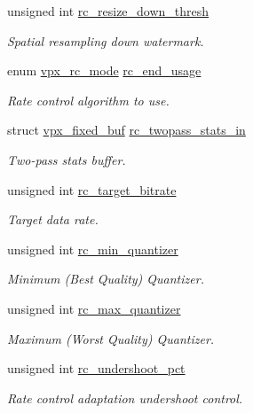 \begin{DoxyCompactItemize}
unsigned int \hyperlink{structvpx__codec__enc__cfg_a1be7bd7b0eaf1e99b5e4028c37c65488}{rc\-\_\-resize\-\_\-down\-\_\-thresh}
\begin{DoxyCompactList}\small\item\em Spatial resampling down watermark. \end{DoxyCompactList}\item 
enum \hyperlink{group__encoder_gaf50e74d91be4cae6f70dfeba5b7410d2}{vpx\-\_\-rc\-\_\-mode} \hyperlink{structvpx__codec__enc__cfg_a99c415edb6c6f909a095a57c3430a116}{rc\-\_\-end\-\_\-usage}
\begin{DoxyCompactList}\small\item\em Rate control algorithm to use. \end{DoxyCompactList}\item 
struct \hyperlink{structvpx__fixed__buf}{vpx\-\_\-fixed\-\_\-buf} \hyperlink{structvpx__codec__enc__cfg_a618616a07d9d8883c544731957b56f3c}{rc\-\_\-twopass\-\_\-stats\-\_\-in}
\begin{DoxyCompactList}\small\item\em Two-\/pass stats buffer. \end{DoxyCompactList}\item 
unsigned int \hyperlink{structvpx__codec__enc__cfg_ab8339685175d66710f482706cc9f0aed}{rc\-\_\-target\-\_\-bitrate}
\begin{DoxyCompactList}\small\item\em Target data rate. \end{DoxyCompactList}\item 
unsigned int \hyperlink{structvpx__codec__enc__cfg_a1324600e3c63faaa7717e85cf6509dd9}{rc\-\_\-min\-\_\-quantizer}
\begin{DoxyCompactList}\small\item\em Minimum (Best Quality) Quantizer. \end{DoxyCompactList}\item 
unsigned int \hyperlink{structvpx__codec__enc__cfg_a8abdd985d317b720e142335887d737df}{rc\-\_\-max\-\_\-quantizer}
\begin{DoxyCompactList}\small\item\em Maximum (Worst Quality) Quantizer. \end{DoxyCompactList}\item 
unsigned int \hyperlink{structvpx__codec__enc__cfg_ad279fbb0a9fe9395340913161e28651a}{rc\-\_\-undershoot\-\_\-pct}
\begin{DoxyCompactList}\small\item\em Rate control adaptation undershoot control. \end{DoxyCompactList}\item 

\end{DoxyCompactItemize}
